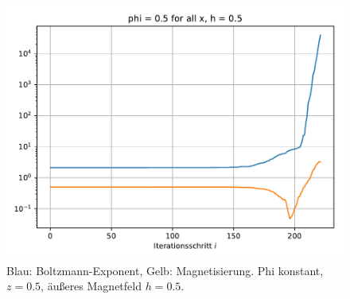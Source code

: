 \documentclass[10pt,a4paper]{article}
\begin{document}
\begin{figure}[H]
  \centering
  \includegraphics[width=\textwidth]{../figures/phi_pt5_h_pt5.pdf}
  \caption{Blau: Boltzmann-Exponent, Gelb: Magnetisierung. Phi konstant, $z=0.5$, äußeres Magnetfeld $h=0.5$.}
\end{figure}
\end{document}
